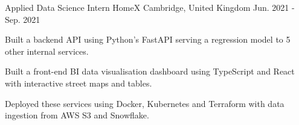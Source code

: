 \begin{cventries}
  \cventry
    {Applied Data Science Intern} %
    {HomeX} %
    {Cambridge, United Kingdom} %
    {Jun. 2021 - Sep. 2021} %
    {
      \begin{cvitems} %
        \item {Built a backend API using Python's FastAPI serving a regression model to 5 other internal services.}
        \item {Built a front-end BI data visualisation dashboard using TypeScript and React with interactive street maps and tables.}
        \item {Deployed these services using Docker, Kubernetes and Terraform with data ingestion from AWS S3 and Snowflake.}
      \end{cvitems}
    }


\end{cventries}
